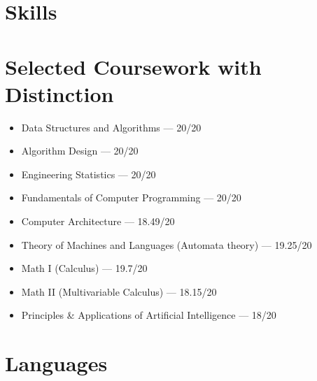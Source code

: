 \documentclass[11pt,a4paper,sans]{moderncv}
\begin{document}
\section{Skills}


\section{Selected Coursework with Distinction}
\begin{itemize}
  \item Data Structures and Algorithms — 20/20
  \item Algorithm Design — 20/20
  \item Engineering Statistics — 20/20
  \item Fundamentals of Computer Programming — 20/20
  \item Computer Architecture — 18.49/20
  \item Theory of Machines and Languages (Automata theory) — 19.25/20
  \item Math I (Calculus) — 19.7/20
  \item Math II (Multivariable Calculus) — 18.15/20
  \item Principles \& Applications of Artificial Intelligence — 18/20
\end{itemize}



\section{Languages}
\end{document}
